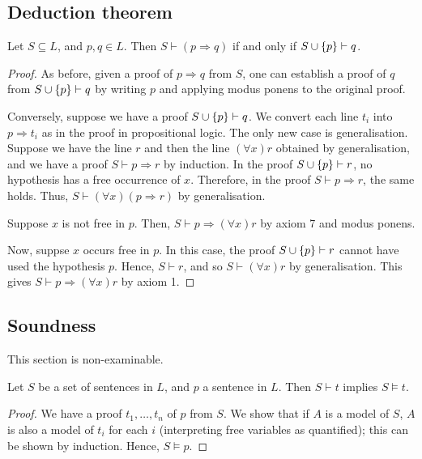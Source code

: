 \subsection{Deduction theorem}
\begin{proposition}
    Let \( S \subseteq L \), and \( p, q \in L \).
    Then \( S \vdash (p \Rightarrow q) \) if and only if \( S \cup \qty{p} \vdash q \).
\end{proposition}
\begin{proof}
    As before, given a proof of \( p \Rightarrow q \) from \( S \), one can establish a proof of \( q \) from \( S \cup \qty{p} \vdash q \) by writing \( p \) and applying modus ponens to the original proof.

    Conversely, suppose we have a proof \( S \cup \qty{p} \vdash q \).
    We convert each line \( t_i \) into \( p \Rightarrow t_i \) as in the proof in propositional logic.
    The only new case is generalisation.
    Suppose we have the line \( r \) and then the line \( (\forall x) r \) obtained by generalisation, and we have a proof \( S \vdash p \Rightarrow r \) by induction.
    In the proof \( S \cup \qty{p} \vdash r \), no hypothesis has a free occurrence of \( x \).
    Therefore, in the proof \( S \vdash p \Rightarrow r \), the same holds.
    Thus, \( S \vdash (\forall x)(p \Rightarrow r) \) by generalisation.

    Suppose \( x \) is not free in \( p \).
    Then, \( S \vdash p \Rightarrow (\forall x)r \) by axiom 7 and modus ponens.

    Now, suppse \( x \) occurs free in \( p \).
    In this case, the proof \( S \cup \qty{p} \vdash r \) cannot have used the hypothesis \( p \).
    Hence, \( S \vdash r \), and so \( S \vdash (\forall x)r \) by generalisation.
    This gives \( S \vdash p \Rightarrow (\forall x)r \) by axiom 1.
\end{proof}

\subsection{Soundness}
This section is non-examinable.
\begin{proposition}
    Let \( S \) be a set of sentences in \( L \), and \( p \) a sentence in \( L \).
    Then \( S \vdash t \) implies \( S \models t \).
\end{proposition}
\begin{proof}
    We have a proof \( t_1, \dots, t_n \) of \( p \) from \( S \).
    We show that if \( A \) is a model of \( S \), \( A \) is also a model of \( t_i \) for each \( i \) (interpreting free variables as quantified); this can be shown by induction.
    Hence, \( S \models p \).
\end{proof}

